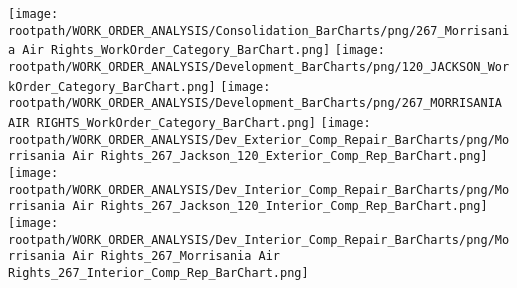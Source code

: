 \texttt{[image: \\rootpath/WORK\_ORDER\_ANALYSIS/Consolidation\_BarCharts/png/267\_Morrisania Air Rights\_WorkOrder\_Category\_BarChart.png]}
\texttt{[image: \\rootpath/WORK\_ORDER\_ANALYSIS/Development\_BarCharts/png/120\_JACKSON\_WorkOrder\_Category\_BarChart.png]}
\texttt{[image: \\rootpath/WORK\_ORDER\_ANALYSIS/Development\_BarCharts/png/267\_MORRISANIA AIR RIGHTS\_WorkOrder\_Category\_BarChart.png]}
\texttt{[image: \\rootpath/WORK\_ORDER\_ANALYSIS/Dev\_Exterior\_Comp\_Repair\_BarCharts/png/Morrisania Air Rights\_267\_Jackson\_120\_Exterior\_Comp\_Rep\_BarChart.png]}
\texttt{[image: \\rootpath/WORK\_ORDER\_ANALYSIS/Dev\_Interior\_Comp\_Repair\_BarCharts/png/Morrisania Air Rights\_267\_Jackson\_120\_Interior\_Comp\_Rep\_BarChart.png]}
\texttt{[image: \\rootpath/WORK\_ORDER\_ANALYSIS/Dev\_Interior\_Comp\_Repair\_BarCharts/png/Morrisania Air Rights\_267\_Morrisania Air Rights\_267\_Interior\_Comp\_Rep\_BarChart.png]}
